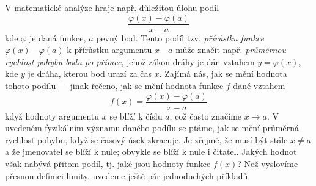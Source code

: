 {    V matematické analýze hraje např. důležitou úlohu podíl \cite[s.~117]{Brabec1989}
    \begin{equation*}
      \dfrac{\varphi(x) - \varphi(a)}{x - a}
    \end{equation*}
    kde \(\varphi\) je daná funkce, \(a\) pevný bod. Tento podíl tzv. \emph{přírůstku funkce} 
    \(\varphi(x) — \varphi(a)\) k přírůstku argumentu \(x — a\) může značit např. \emph{průměrnou 
    rychlost pohybu bodu po přímce}, jehož zákon dráhy je dán vztahem \(y = \varphi(x)\), kde \(y\) 
    je dráha, kterou bod urazí za čas \(x\). Zajímá nás, jak se mění hodnota tohoto podílu — jinak 
    řečeno, jak se mění hodnota funkce \(f\) dané vztahem
    \begin{equation}\label{mai:eq037}
      f(x) = \dfrac{\varphi(x) - \varphi(a)}{x - a}
    \end{equation}
    když hodnoty argumentu \(x\) se blíží k číslu \(a\), což často značíme \(x\rightarrow a\). V 
    uvedeném fyzikálním významu daného podílu se ptáme, jak se mění průměrná rychlost pohybu, když 
    se časový úsek zkracuje. Je zřejmé, že musí být stále \(x \neq a\) a že jmenovatel se blíží k 
    nule; obvykle se blíží k nule i čitatel. Jakých hodnot však nabývá přitom podíl, tj. jaké jsou 
    hodnoty funkce \(f(x)\)? Než vyslovíme přesnou definici limity, uvedeme ještě pár jednoduchých 
    příkladů.

      

}
